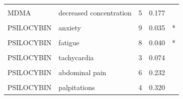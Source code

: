 \begin{table}[!h]
{\begin{tabular}[t]{llrll}
\cellcolor{gray!10}{MDMA} & \cellcolor{gray!10}{dissociation} & \cellcolor{gray!10}{3} & \cellcolor{gray!10}{0.174} & \cellcolor{gray!10}{}\\
MDMA & decreased concentration & 5 & 0.177 & \\
\addlinespace
\cellcolor{gray!10}{PSILOCYBIN} & \cellcolor{gray!10}{headache} & \cellcolor{gray!10}{11} & \cellcolor{gray!10}{0.014} & \cellcolor{gray!10}{*}\\
PSILOCYBIN & anxiety & 9 & 0.035 & *\\
\cellcolor{gray!10}{PSILOCYBIN} & \cellcolor{gray!10}{nausea} & \cellcolor{gray!10}{10} & \cellcolor{gray!10}{0.036} & \cellcolor{gray!10}{*}\\
PSILOCYBIN & fatigue & 8 & 0.040 & *\\
\cellcolor{gray!10}{PSILOCYBIN} & \cellcolor{gray!10}{depression} & \cellcolor{gray!10}{3} & \cellcolor{gray!10}{0.071} & \cellcolor{gray!10}{}\\
\addlinespace
PSILOCYBIN & tachycardia & 3 & 0.074 & \\
\cellcolor{gray!10}{PSILOCYBIN} & \cellcolor{gray!10}{hypertension} & \cellcolor{gray!10}{6} & \cellcolor{gray!10}{0.100} & \cellcolor{gray!10}{}\\
PSILOCYBIN & abdominal pain & 6 & 0.232 & \\
\cellcolor{gray!10}{PSILOCYBIN} & \cellcolor{gray!10}{dizziness} & \cellcolor{gray!10}{7} & \cellcolor{gray!10}{0.248} & \cellcolor{gray!10}{}\\
PSILOCYBIN & palpitations & 4 & 0.320 & \\
\bottomrule
\end{tabular}}
\end{table}
